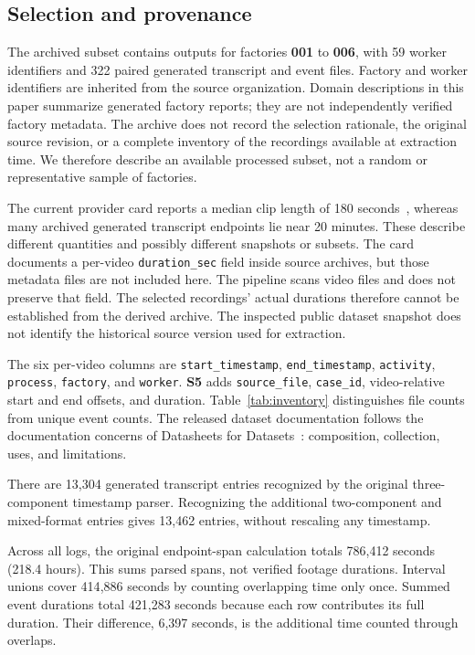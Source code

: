 \subsection{Selection and provenance}
The archived subset contains outputs for factories \textbf{001} to \textbf{006}, with 59 worker identifiers and 322 paired generated transcript and event files. Factory and worker identifiers are inherited from the source organization. Domain descriptions in this paper summarize generated factory reports; they are not independently verified factory metadata. The archive does not record the selection rationale, the original source revision, or a complete inventory of the recordings available at extraction time. We therefore describe an available processed subset, not a random or representative sample of factories.

The current provider card reports a median clip length of 180 seconds~\cite{build2025egocentric}, whereas many archived generated transcript endpoints lie near 20 minutes. These describe different quantities and possibly different snapshots or subsets. The card documents a per-video \texttt{duration\_sec} field inside source archives, but those metadata files are not included here. The pipeline scans video files and does not preserve that field. The selected recordings' actual durations therefore cannot be established from the derived archive. The inspected public dataset snapshot does not identify the historical source version used for extraction.

The six per-video columns are \texttt{start\_timestamp}, \texttt{end\_timestamp}, \texttt{activity}, \texttt{process}, \texttt{factory}, and \texttt{worker}. \textbf{S5} adds \texttt{source\_file}, \texttt{case\_id}, video-relative start and end offsets, and duration. Table~\ref{tab:inventory} distinguishes file counts from unique event counts. The released dataset documentation follows the documentation concerns of Datasheets for Datasets~\cite{gebru2021datasheets}: composition, collection, uses, and limitations.

There are 13{,}304 generated transcript entries recognized by the original three-component timestamp parser. Recognizing the additional two-component and mixed-format entries gives 13{,}462 entries, without rescaling any timestamp.

Across all logs, the original endpoint-span calculation totals 786{,}412 seconds (218.4 hours). This sums parsed spans, not verified footage durations. Interval unions cover 414{,}886 seconds by counting overlapping time only once. Summed event durations total 421{,}283 seconds because each row contributes its full duration. Their difference, 6{,}397 seconds, is the additional time counted through overlaps.

